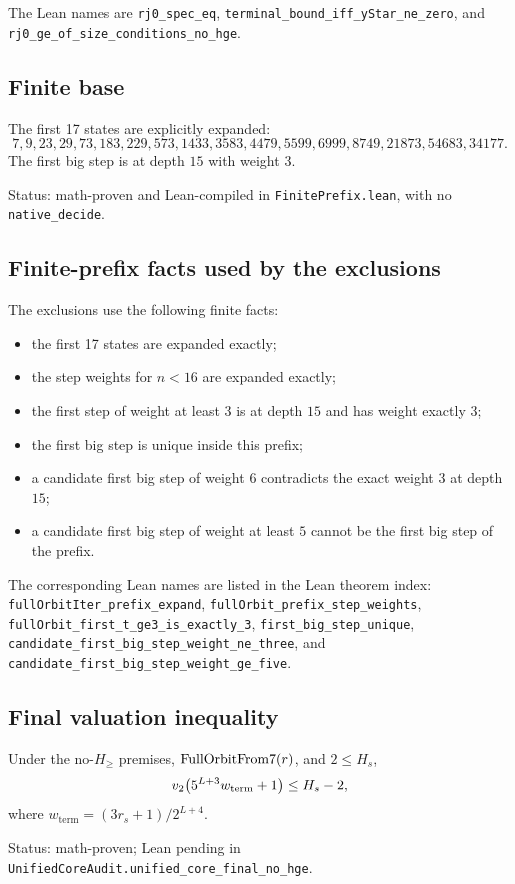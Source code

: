 The Lean names are \texttt{rj0\_spec\_eq},
\texttt{terminal\_bound\_iff\_yStar\_ne\_zero}, and
\texttt{rj0\_ge\_of\_size\_conditions\_no\_hge}.

\subsection{Finite base}

The first 17 states are explicitly expanded:
\begin{equation*}
  7,9,23,29,73,183,229,573,1433,3583,4479,5599,6999,8749,21873,54683,34177.
\end{equation*}
The first big step is at depth $15$ with weight $3$.

Status: math-proven and Lean-compiled in
\texttt{FinitePrefix.lean}, with no \texttt{native\_decide}.

\subsection{Finite-prefix facts used by the exclusions}

The exclusions use the following finite facts:
\begin{itemize}[leftmargin=*]
\item the first 17 states are expanded exactly;
\item the step weights for $n<16$ are expanded exactly;
\item the first step of weight at least $3$ is at depth $15$ and has
  weight exactly $3$;
\item the first big step is unique inside this prefix;
\item a candidate first big step of weight $6$ contradicts the exact
  weight $3$ at depth $15$;
\item a candidate first big step of weight at least $5$ cannot be the
  first big step of the prefix.
\end{itemize}

The corresponding Lean names are listed in the Lean theorem index:
\texttt{fullOrbitIter\_\allowbreak prefix\_expand},
\texttt{fullOrbit\_\allowbreak prefix\_step\_weights},
\texttt{fullOrbit\_\allowbreak first\_t\_ge3\_is\_exactly\_3},
\texttt{first\_\allowbreak big\_step\_unique},
\texttt{candidate\_\allowbreak first\_big\_step\_weight\_ne\_three}, and
\texttt{candidate\_\allowbreak first\_big\_step\_weight\_ge\_five}.

\subsection{Final valuation inequality}

\begin{theorem}
Under the no-$H_{\ge}$ premises, $\mathrm{FullOrbitFrom7}(r)$, and $2\le H_s$,
\begin{equation*}
  v_2\!\left(5^{L+3}w_{\mathrm{term}}+1\right)\le H_s-2,
\end{equation*}
where $w_{\mathrm{term}}=(3r_s+1)/2^{L+4}$.
\end{theorem}

Status: math-proven; Lean pending in
\texttt{UnifiedCoreAudit.unified\_core\_final\_no\_hge}.
